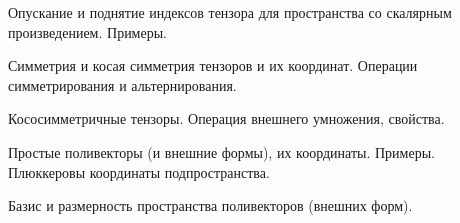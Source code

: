 \documentclass[a4paper]{article}
\begin{document}
\begin{nums}{-2}
\item Опускание и поднятие индексов тензора для пространства со скалярным произведением.
Примеры.
\item Симметрия и косая симметрия тензоров и их координат. Операции симметрирования и альтернирования.
\item Кососимметричные тензоры. Операция внешнего умножения, свойства.
\item Простые поливекторы (и внешние формы), их координаты. Примеры.
Плюккеровы координаты подпространства.
\item Базис и размерность пространства поливекторов (внешних форм).
\end{nums}

\medskip\dmvntrail
\end{document}
